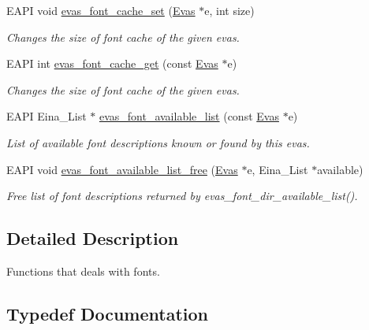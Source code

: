 \begin{DoxyCompactItemize}
EAPI void \hyperlink{group__Evas__Font__Group_ga5582cfcdb08f6253225bb8cede49033a}{evas\_\-font\_\-cache\_\-set} (\hyperlink{group__Evas__Canvas_ga5ff87cc4ce6bc43e3b640a6d37f73043}{Evas} $\ast$e, int size)
\begin{DoxyCompactList}\small\item\em Changes the size of font cache of the given evas. \item\end{DoxyCompactList}\item 
EAPI int \hyperlink{group__Evas__Font__Group_ga9cf39aae3074cac05c4aafa3ff24c32f}{evas\_\-font\_\-cache\_\-get} (const \hyperlink{group__Evas__Canvas_ga5ff87cc4ce6bc43e3b640a6d37f73043}{Evas} $\ast$e)
\begin{DoxyCompactList}\small\item\em Changes the size of font cache of the given evas. \item\end{DoxyCompactList}\item 
EAPI Eina\_\-List $\ast$ \hyperlink{group__Evas__Font__Group_ga9d51a2efecf89a81a2990db252f3dc6c}{evas\_\-font\_\-available\_\-list} (const \hyperlink{group__Evas__Canvas_ga5ff87cc4ce6bc43e3b640a6d37f73043}{Evas} $\ast$e)
\begin{DoxyCompactList}\small\item\em List of available font descriptions known or found by this evas. \item\end{DoxyCompactList}\item 
EAPI void \hyperlink{group__Evas__Font__Group_gadde47be1a7d61f416bfa365a5a1e1467}{evas\_\-font\_\-available\_\-list\_\-free} (\hyperlink{group__Evas__Canvas_ga5ff87cc4ce6bc43e3b640a6d37f73043}{Evas} $\ast$e, Eina\_\-List $\ast$available)
\begin{DoxyCompactList}\small\item\em Free list of font descriptions returned by evas\_\-font\_\-dir\_\-available\_\-list(). \item\end{DoxyCompactList}\end{DoxyCompactItemize}


\subsection{Detailed Description}
Functions that deals with fonts. 

\subsection{Typedef Documentation}
